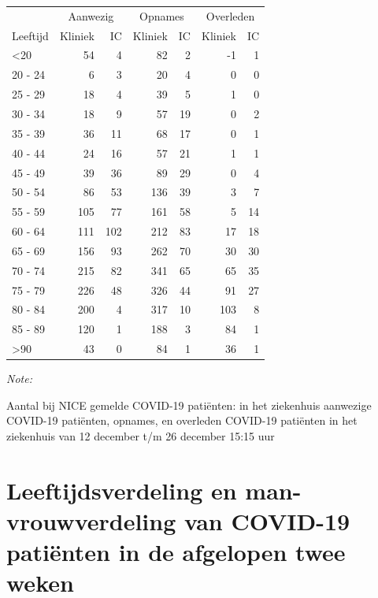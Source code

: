 \documentclass[
  english,
  man,floatsintext]{apa6}
\begin{document}
\begin{table}
\centering\begingroup\fontsize{10}{12}\selectfont

\begin{threeparttable}
\begin{tabular}{lrrrrrr}
\toprule
\multicolumn{1}{c}{ } & \multicolumn{2}{c}{Aanwezig} & \multicolumn{2}{c}{Opnames} & \multicolumn{2}{c}{Overleden} \\
\cmidrule(l{3pt}r{3pt}){2-3} \cmidrule(l{3pt}r{3pt}){4-5} \cmidrule(l{3pt}r{3pt}){6-7}
Leeftijd & Kliniek & IC & Kliniek & IC & Kliniek & IC\\
\midrule
<20 & 54 & 4 & 82 & 2 & -1 & 1\\
20 - 24 & 6 & 3 & 20 & 4 & 0 & 0\\
25 - 29 & 18 & 4 & 39 & 5 & 1 & 0\\
30 - 34 & 18 & 9 & 57 & 19 & 0 & 2\\
35 - 39 & 36 & 11 & 68 & 17 & 0 & 1\\
40 - 44 & 24 & 16 & 57 & 21 & 1 & 1\\
45 - 49 & 39 & 36 & 89 & 29 & 0 & 4\\
50 - 54 & 86 & 53 & 136 & 39 & 3 & 7\\
55 - 59 & 105 & 77 & 161 & 58 & 5 & 14\\
60 - 64 & 111 & 102 & 212 & 83 & 17 & 18\\
65 - 69 & 156 & 93 & 262 & 70 & 30 & 30\\
70 - 74 & 215 & 82 & 341 & 65 & 65 & 35\\
75 - 79 & 226 & 48 & 326 & 44 & 91 & 27\\
80 - 84 & 200 & 4 & 317 & 10 & 103 & 8\\
85 - 89 & 120 & 1 & 188 & 3 & 84 & 1\\
>90 & 43 & 0 & 84 & 1 & 36 & 1\\
\bottomrule
\end{tabular}
\begin{tablenotes}
\item \textit{Note: } 
\item Aantal bij NICE gemelde COVID-19 patiënten: in het ziekenhuis aanwezige COVID-19 patiënten, opnames, en overleden COVID-19 patiënten in het ziekenhuis van 12 december t/m 26 december 15:15 uur
\end{tablenotes}
\end{threeparttable}
\endgroup{}
\end{table}

\newpage

\hypertarget{leeftijdsverdeling-en-man-vrouwverdeling-van-covid-19-patiuxebnten-in-de-afgelopen-twee-weken}{%
\section{Leeftijdsverdeling en man-vrouwverdeling van COVID-19 patiënten in de afgelopen twee weken}\label{leeftijdsverdeling-en-man-vrouwverdeling-van-covid-19-patiuxebnten-in-de-afgelopen-twee-weken}}
\end{document}
